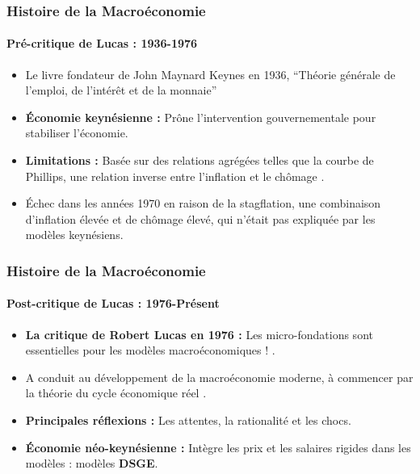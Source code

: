 \documentclass{beamer}
\begin{document}
    

\begin{frame}
    \frametitle{Histoire de la Macroéconomie}
    \framesubtitle{Pré-critique de Lucas : 1936-1976}
        \begin{itemize}
            \item Le livre fondateur de John Maynard Keynes en 1936, \enquote{Théorie générale de l'emploi, de l'intérêt et de la monnaie}
            \item \textbf{Économie keynésienne :} Prône l'intervention gouvernementale pour stabiliser l'économie.
            \item \textbf{Limitations :} Basée sur des relations agrégées telles que la courbe de Phillips,
            une relation inverse entre l'inflation et le chômage \parencite{Phillips_1958}.
            \item Échec dans les années 1970 en raison de la stagflation, une combinaison d'inflation élevée et de chômage élevé,
            qui n'était pas expliquée par les modèles keynésiens.
        \end{itemize}
    \end{frame}
    \begin{frame}
        \frametitle{Histoire de la Macroéconomie}
        \framesubtitle{Post-critique de Lucas : 1976-Présent}
                \begin{itemize}
                    \item \textbf{La critique de Robert Lucas en 1976 :} Les micro-fondations sont essentielles pour les modèles macroéconomiques ! \parencite{Lucas_1976}.
                    \item A conduit au développement de la macroéconomie moderne, à commencer par la théorie du cycle économique réel \textcite{Kydland_Prescott_1982}.
                    \item \textbf{Principales réflexions :} Les attentes, la rationalité et les chocs.
                    \item \textbf{Économie néo-keynésienne :} Intègre les prix et les salaires rigides dans les modèles : modèles \textbf{DSGE}.
                \end{itemize}
    \end{frame}
                        
\end{document}
